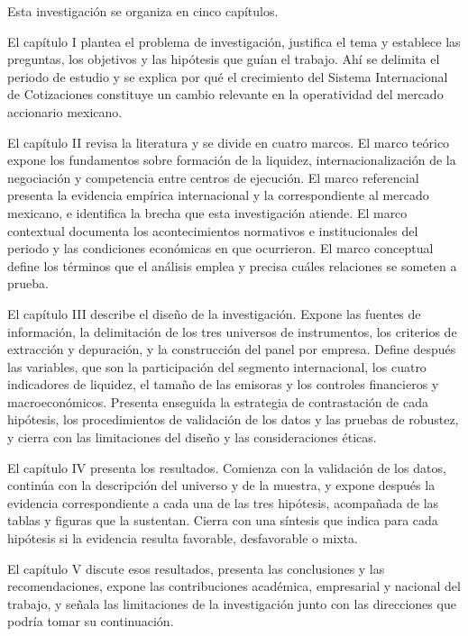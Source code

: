 
Esta investigación se organiza en cinco capítulos.

El capítulo I plantea el problema de investigación, justifica el tema y establece las preguntas, los objetivos y las hipótesis que guían el trabajo. Ahí se delimita el periodo de estudio y se explica por qué el crecimiento del Sistema Internacional de Cotizaciones constituye un cambio relevante en la operatividad del mercado accionario mexicano.

El capítulo II revisa la literatura y se divide en cuatro marcos. El marco teórico expone los fundamentos sobre formación de la liquidez, internacionalización de la negociación y competencia entre centros de ejecución. El marco referencial presenta la evidencia empírica internacional y la correspondiente al mercado mexicano, e identifica la brecha que esta investigación atiende. El marco contextual documenta los acontecimientos normativos e institucionales del periodo y las condiciones económicas en que ocurrieron. El marco conceptual define los términos que el análisis emplea y precisa cuáles relaciones se someten a prueba.

El capítulo III describe el diseño de la investigación. Expone las fuentes de información, la delimitación de los tres universos de instrumentos, los criterios de extracción y depuración, y la construcción del panel por empresa. Define después las variables, que son la participación del segmento internacional, los cuatro indicadores de liquidez, el tamaño de las emisoras y los controles financieros y macroeconómicos. Presenta enseguida la estrategia de contrastación de cada hipótesis, los procedimientos de validación de los datos y las pruebas de robustez, y cierra con las limitaciones del diseño y las consideraciones éticas.

El capítulo IV presenta los resultados. Comienza con la validación de los datos, continúa con la descripción del universo y de la muestra, y expone después la evidencia correspondiente a cada una de las tres hipótesis, acompañada de las tablas y figuras que la sustentan. Cierra con una síntesis que indica para cada hipótesis si la evidencia resulta favorable, desfavorable o mixta.

El capítulo V discute esos resultados, presenta las conclusiones y las recomendaciones, expone las contribuciones académica, empresarial y nacional del trabajo, y señala las limitaciones de la investigación junto con las direcciones que podría tomar su continuación.

